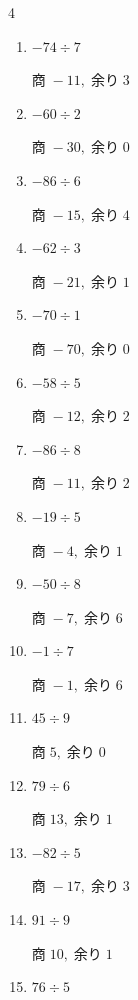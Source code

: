 \begin{multicols}{4}
\begin{enumerate}
        $商\; 4,\; 余り\; 1$

  \item $-74 \div 7$

        $商\; -11,\; 余り\; 3$

  \item $-60 \div 2$

        $商\; -30,\; 余り\; 0$

  \item $-86 \div 6$

        $商\; -15,\; 余り\; 4$

  \item $-62 \div 3$

        $商\; -21,\; 余り\; 1$

  \item $-70 \div 1$

        $商\; -70,\; 余り\; 0$

  \item $-58 \div 5$

        $商\; -12,\; 余り\; 2$

  \item $-86 \div 8$

        $商\; -11,\; 余り\; 2$

  \item $-19 \div 5$

        $商\; -4,\; 余り\; 1$

  \item $-50 \div 8$

        $商\; -7,\; 余り\; 6$

  \item $-1 \div 7$

        $商\; -1,\; 余り\; 6$

  \item $45 \div 9$

        $商\; 5,\; 余り\; 0$

  \item $79 \div 6$

        $商\; 13,\; 余り\; 1$

  \item $-82 \div 5$

        $商\; -17,\; 余り\; 3$

\columnbreak %

  \item $91 \div 9$

        $商\; 10,\; 余り\; 1$

  \item $76 \div 5$


\end{enumerate}
\end{multicols}
